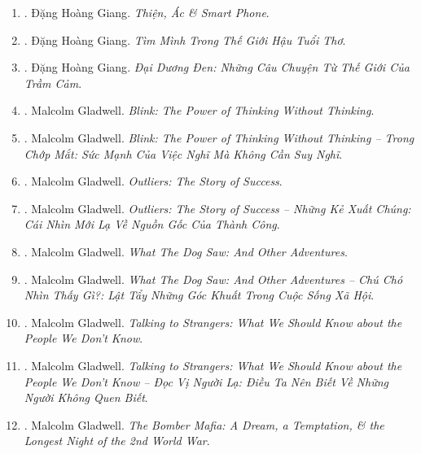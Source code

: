 \documentclass{article}
\begin{document}
\begin{enumerate}
	\item \cite{Giang_smartphone}. {\sc Đặng Hoàng Giang}. {\it Thiện, Ác \& Smart Phone}.\hfill{\sf[done]}
	
	\item \cite{Giang_after_childhood}. {\sc Đặng Hoàng Giang}. {\it Tìm Mình Trong Thế Giới Hậu Tuổi Thơ}.\hfill{\sf[done]}
	
	\item \cite{Giang_dai_duong_den}. {\sc Đặng Hoàng Giang}. {\it Đại Dương Đen: Những Câu Chuyện Từ Thế Giới Của Trầm Cảm}.\hfill{\sf[done]}
	
	\item \cite{Gladwell2007}. Malcolm Gladwell. {\it Blink: The Power of Thinking Without Thinking}.\hfill{\sf[reading]}
	
	\item \cite{Gladwell_blink}. Malcolm Gladwell. {\it Blink: The Power of Thinking Without Thinking -- Trong Chớp Mắt: Sức Mạnh Của Việc Nghĩ Mà Không Cần Suy Nghĩ}.\hfill{\sf[done]}
	
	\item \cite{Gladwell2008}. Malcolm Gladwell. {\it Outliers: The Story of Success}.\hfill{\sf[reading]}
	
	\item \cite{Gladwell_outlier}. Malcolm Gladwell. {\it Outliers: The Story of Success -- Những Kẻ Xuất Chúng: Cái Nhìn Mới Lạ Về Nguồn Gốc Của Thành Công}.\hfill{\sf[done]}
	
	\item \cite{Gladwell2009}. Malcolm Gladwell. {\it What The Dog Saw: And Other Adventures}.\hfill{\sf[reading]}
	
	\item \cite{Gladwell_dog}. Malcolm Gladwell. {\it What The Dog Saw: And Other Adventures -- Chú Chó Nhìn Thấy Gì?: Lật Tẩy Những Góc Khuất Trong Cuộc Sống Xã Hội}.\hfill{\sf[done]}
	
	\item \cite{Gladwell2019}. Malcolm Gladwell. {\it Talking to Strangers: What We Should Know about the People We Don't Know}.\hfill{\sf[reading]}
	
	\item \cite{Gladwell_stranger}. Malcolm Gladwell. {\it Talking to Strangers: What We Should Know about the People We Don't Know -- Đọc Vị Người Lạ: Điều Ta Nên Biết Về Những Người Không Quen Biết}.\hfill{\sf[done]}
	
	\item \cite{Gladwell2021}. Malcolm Gladwell. {\it The Bomber Mafia: A Dream, a Temptation, \& the Longest Night of the 2nd World War}.\hfill{\sf[reading]}
	

\end{enumerate}
\end{document}
